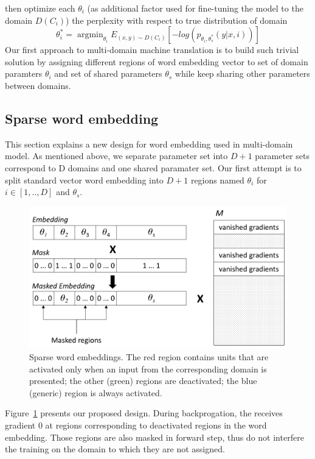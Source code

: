 \documentclass[11pt,a4paper]{article}
\DeclareMathOperator*{\argmin}{argmin}
\newcommand{\fyTodo}[1]{\Todo[FY:]{\textcolor{orange}{#1}}}
\begin{document}
then optimize each $\theta_i$ (as additional factor used for fine-tuning the model to the domain $D(C_{i})$) the perplexity with respect to true distribution of domain
\begin{equation}
\theta^*_{i} = \displaystyle{\mathop{\argmin}_{\theta_i}}E_{(x,y) \sim D(C_{i})}[-log(p_{\theta_i,\theta^*_s}(y|x,i))]
\end{equation} 
Our first approach to multi-domain machine translation is to build such trivial solution by assigning different regions of word embedding vector to set of domain paramters $\theta_i$ and set of shared parameters $\theta_s$ while keep sharing other parameters between domains.
\subsection{Sparse word embedding}
\label{sec:sparse}
This section explains a new design for word embedding used in multi-domain model. As mentioned above, we separate parameter set into $D+1$ parameter sets correspond to D domains and one shared paramater set. Our first attempt is to split standard vector word embedding into $D+1$ regions named $\theta_i$ for $i \in [1,..,D]$ and $\theta_s$.
\begin{figure}[h]
\center
    \includegraphics[width=\linewidth]{embeddings}
    \caption{Sparse word embeddings. The red region contains units that are activated only when an input from the corresponding domain is presented; the other (green) regions are deactivated; the blue (generic) region is always activated.} 
    \label{fig:network}
  \end{figure}
\fyTodo{Explain vanishing ?}
Figure~\ref{fig:network} presents our proposed design. During backprogation, the \fyTodo{fix notation}{projection matrix $M$} receives gradient 0 at regions corresponding to deactivated regions in the word embedding. Those regions are also masked in forward step, thus do not interfere the training on the domain to which they are not assigned.
\end{document}
